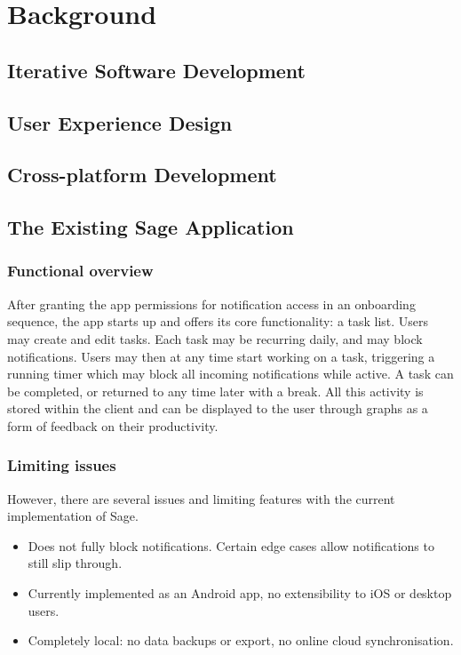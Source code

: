 \chapter{Background}

\label{ch:background}

\section{Iterative Software Development}

\section{User Experience Design}


\section{Cross-platform Development}



\section{The Existing Sage Application}
\subsection{Functional overview}
After granting the app permissions for notification access in an onboarding sequence, the app starts up and offers its core functionality: a task list. Users may create and edit tasks. Each task may be recurring daily, and may block notifications. Users may then at any time start working on a task, triggering a running timer which may block all incoming notifications while active. A task can be completed, or returned to any time later with a break. All this activity is stored within the client and can be displayed to the user through graphs as a form of feedback on their productivity.


\subsection{Limiting issues}
However, there are several issues and limiting features with the current implementation of Sage.

\begin{itemize}
    \item Does not fully block notifications. Certain edge cases allow notifications to still slip through.
    \item Currently implemented as an Android app, no extensibility to iOS or desktop users.
    \item Completely local: no data backups or export, no online cloud synchronisation.
\end{itemize}


